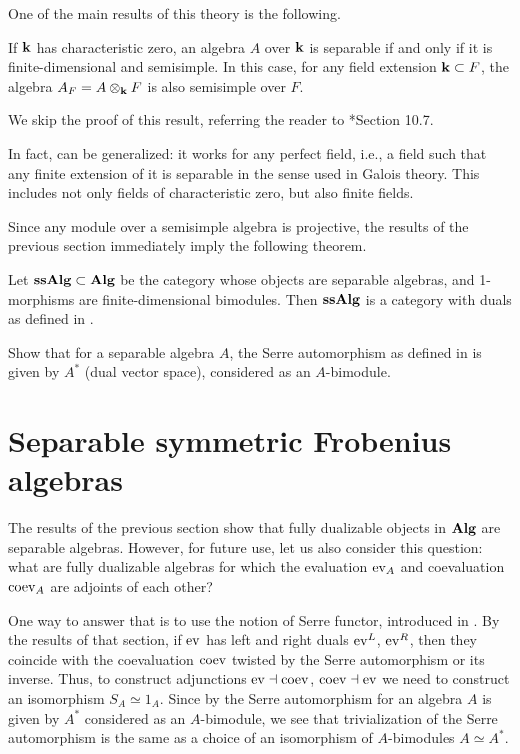 One of the main results of this theory is the following.
\begin{theorem}\label{t:separable-ss}
  If $\mathbf{k}$ has characteristic zero, an algebra $A$ over $\mathbf{k}$ is
  separable if and only if it is finite-dimensional and semisimple.
  In this case, for any field extension $\mathbf{k}\subset F$, the algebra
  $A_F=A\otimes_{\mathbf{k}} F$ is also semisimple over $F$.
\end{theorem}
We skip the proof of this result, referring the reader to
*{Section 10.7}.

\begin{remark}
  In fact,  can be generalized: it works for any perfect
  field, i.e., a field such that any finite extension of it is separable in the
  sense used in Galois theory. This includes not only fields of characteristic
  zero, but also finite fields.
\end{remark}




Since any module over a semisimple algebra is projective,
the results of the previous section immediately imply the following theorem.
\begin{theorem}\label{t:ssalg}
  Let $\mathbf{ssAlg}\subset \mathbf{Alg}$ be the category whose objects are separable
  algebras, and 1-morphisms are finite-dimensional
  bimodules. Then $\mathbf{ssAlg}$ is a category with duals as defined in
  .
\end{theorem}

\begin{exercise}\label{ec:serre-separable}
  Show that for a separable algebra $A$, the Serre automorphism as defined in
   is given by $A^*$ (dual vector space), considered as
  an $A$-bimodule.
\end{exercise}




\section{Separable symmetric Frobenius algebras}\label{s:ssfrob}
The results of the previous section show that fully dualizable objects in $\mathbf{Alg}$ are
separable algebras. However, for future use, let us also consider this question:
what are fully dualizable algebras for which the evaluation $\operatorname{ev}_A$ and
coevaluation $\operatorname{coev}_A$ are adjoints of each other?


One way to answer that is to use the notion of Serre functor, introduced in
. By the results of that section, if $\operatorname{ev}$ has left and right
duals $\operatorname{ev}^L$, $\operatorname{ev}^R$, then they coincide with the coevaluation $\operatorname{coev}$ twisted
by the Serre automorphism or its inverse. Thus, to construct adjunctions
$\operatorname{ev}\dashv\operatorname{coev}$, $\operatorname{coev}\dashv\operatorname{ev}$ we need to construct an isomorphism
$S_A\simeq 1_A$. Since by  the Serre automorphism for
an algebra $A$ is given by $A^*$ considered as an $A$-bimodule, we see that
trivialization of the Serre automorphism is the same as a choice of an
isomorphism of $A$-bimodules $A\simeq A^*$.


